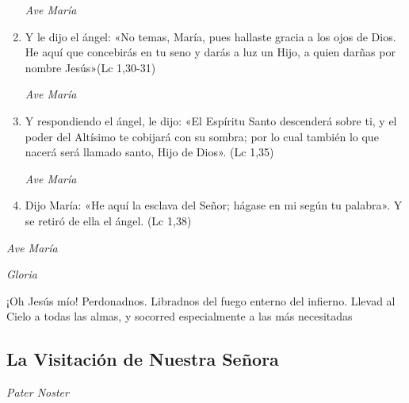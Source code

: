\documentclass[a4paper,11pt, oneside]{report}
\begin{document}
\begin{enumerate}
          \textit{Ave María}

          \item Y le dijo el ángel: «No temas, María, pues hallaste gracia a los ojos de Dios. He aquí que concebirás en tu seno y darás a luz un Hijo,
          a quien darñas por nombre Jesús»(Lc 1,30-31)

          \textit{Ave María}

          \item Y respondiendo el ángel, le dijo: «El Espíritu Santo descenderá sobre ti, y el poder del Altísimo te cobijará con su sombra; por lo cual
          también lo que nacerá será llamado santo, Hijo de Dios». (Lc 1,35)

          \textit{Ave María}

          \item Dijo María: «He aquí la esclava del Señor; hágase en mi según tu palabra». Y se retiró de ella el ángel. (Lc 1,38)
          
        \end{enumerate}

        \textit{Ave María} \par
        \indent\textit{Gloria} \par
        \indent¡Oh Jesús mío! Perdonadnos. Libradnos del fuego enterno del infierno. Llevad al Cielo a todas las almas, y socorred especialmente a las más 
        necesitadas
            
      \subsection*{La Visitación de Nuestra Señora}
      
        \textit{Pater Noster} 
\end{document}
